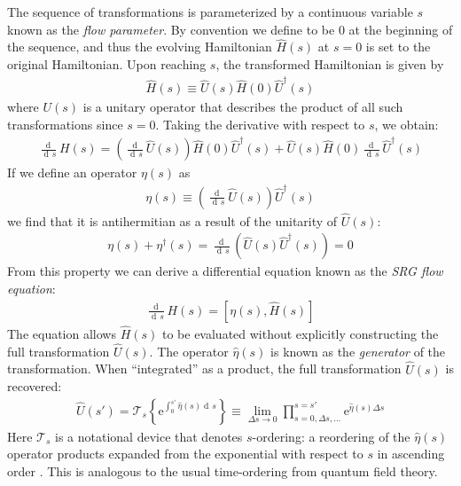 \documentclass[amsmath, amssymb, aps, floatfix, nofootinbib, preprintnumbers,showpacs, superscriptaddress, twocolumn]{revtex4-1}
\newcommand{\D}{\operatorname{d\!}}
\begin{document}
The sequence of transformations is parameterized by a continuous variable $s$
known as the \textit{flow parameter}.  By convention we define to be $0$ at
the beginning of the sequence, and thus the evolving Hamiltonian $\hat H(s)$
at $s = 0$ is set to the original Hamiltonian.  Upon reaching $s$, the
transformed Hamiltonian is given by
\begin{align*}
  \hat H(s) \equiv \hat U(s) \hat H(0) \hat U^\dagger(s)
\end{align*}
where $U(s)$ is a unitary operator that describes the product of all such
transformations since $s = 0$.  Taking the derivative with respect to $s$, we obtain:
\begin{align*}
  \frac{\D}{\D s} H(s) =
  \left(\frac{\D}{\D s} \hat{U}(s)\right) \hat{H}(0) \hat{U}^\dagger(s) +
  \hat{U}(s) \hat{H}(0) \frac{\D}{\D s} \hat{U}^\dagger(s)
\end{align*}
If we define an operator $\eta(s)$ as
\begin{align*}
  \eta(s) \equiv \left(\frac{\D}{\D s} \hat{U}(s)\right) \hat{U}^\dagger(s)
\end{align*}
we find that it is antihermitian as a result of the unitarity of $\hat{U}(s)$:
\begin{align*}
  \eta(s) + \eta^\dagger(s)
  = \frac{\D}{\D s} \left(\hat{U}(s) \hat{U}^\dagger(s)\right)
  = 0
\end{align*}
From this property we can derive a differential equation known as the
\textit{SRG flow equation}:
\begin{align} \label{eq:imsrgode}
  \frac{\D}{\D s} H(s) = [\eta(s), \hat{H}(s)]
\end{align}
The equation allows $\hat{H}(s)$ to be evaluated without explicitly
constructing the full transformation $\hat U(s)$.  The operator $\hat \eta(s)$
is known as the \textit{generator} of the transformation.  When ``integrated''
as a product, the full transformation $\hat U(s)$ is recovered:
\begin{align*}
  \hat U(s')
  = \mathcal T_s \left\{ \mathrm{e}^{\int_0^{s'} \hat{\eta}(s) \D s} \right\}
  \equiv \lim_{\Delta s \to 0} \prod_{s = 0, \Delta s, \ldots}^{s = s'}
  \mathrm{e}^{\hat \eta(s) \Delta s}
\end{align*}
Here $\mathcal T_s$ is a notational device that denotes $s$-ordering: a reordering of the $\hat{\eta}(s)$ operator products expanded from the exponential with respect to $s$ in ascending order \cite[\S 6.1]{reimann2013quantum}.  This is analogous to the usual time-ordering from quantum field theory.
\end{document}
